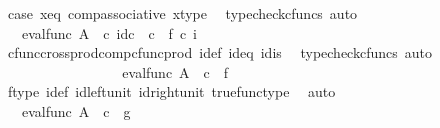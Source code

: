 \begin{isabellebody}
\ case{}\ x{\isacharunderscore}{\kern0pt}eq\ comp{\isacharunderscore}{\kern0pt}associative{}\ x{\isacharunderscore}{\kern0pt}type\ \isamarkupfalse%
\ {\isacharparenleft}{\kern0pt}typecheck{\isacharunderscore}{\kern0pt}cfuncs{\isacharcomma}{\kern0pt}\ auto{\isacharparenright}{\kern0pt}\isanewline
\ \ \ \ \ \ \ \ \ \ \ \ \isamarkupfalse%
\ \isamarkupfalse%
\ {\isachardoublequoteopen}{\isachardot}{\kern0pt}{\isachardot}{\kern0pt}{\isachardot}{\kern0pt}\ {\isacharequal}{\kern0pt}\ eval{\isacharunderscore}{\kern0pt}func\ A\ {\isasymOmega}\ {\isasymcirc}\isactrlsub c\ {\isasymlangle}id\isactrlsub c\ {\isasymOmega}\ {\isasymcirc}\isactrlsub c\ \ {\isasymt}{\isacharcomma}{\kern0pt}f\ {\isasymcirc}\isactrlsub c\ i{\isasymrangle}{\isachardoublequoteclose}\isanewline
\ \ \ \ \ \ \ \ \ \ \ \ \ \ \ \ \isamarkupfalse%
\ cfunc{\isacharunderscore}{\kern0pt}cross{\isacharunderscore}{\kern0pt}prod{\isacharunderscore}{\kern0pt}comp{\isacharunderscore}{\kern0pt}cfunc{\isacharunderscore}{\kern0pt}prod\ i{\isacharunderscore}{\kern0pt}def\ id{}{\isacharunderscore}{\kern0pt}eq\ id{}{\isacharunderscore}{\kern0pt}is\ \isamarkupfalse%
\ {\isacharparenleft}{\kern0pt}typecheck{\isacharunderscore}{\kern0pt}cfuncs{\isacharcomma}{\kern0pt}\ auto{\isacharparenright}{\kern0pt}\isanewline
\ \ \ \ \ \ \ \ \ \ \ \ \isamarkupfalse%
\ \isamarkupfalse%
\ {\isachardoublequoteopen}{\isachardot}{\kern0pt}{\isachardot}{\kern0pt}{\isachardot}{\kern0pt}\ {\isacharequal}{\kern0pt}\ eval{\isacharunderscore}{\kern0pt}func\ A\ {\isasymOmega}\ {\isasymcirc}\isactrlsub c\ {\isasymlangle}{\isasymt}{\isacharcomma}{\kern0pt}\ f\ {\isasymrangle}{\isachardoublequoteclose}\isanewline
\ \ \ \ \ \ \ \ \ \ \ \ \ \ \isamarkupfalse%
\ f{\isacharunderscore}{\kern0pt}type\ i{\isacharunderscore}{\kern0pt}def\ id{\isacharunderscore}{\kern0pt}left{\isacharunderscore}{\kern0pt}unit{}\ id{\isacharunderscore}{\kern0pt}right{\isacharunderscore}{\kern0pt}unit{}\ true{\isacharunderscore}{\kern0pt}func{\isacharunderscore}{\kern0pt}type\ \isamarkupfalse%
\ auto\isanewline
\ \ \ \ \ \ \ \ \ \ \ \ \isamarkupfalse%
\ \isamarkupfalse%
\ {\isachardoublequoteopen}{\isachardot}{\kern0pt}{\isachardot}{\kern0pt}{\isachardot}{\kern0pt}\ {\isacharequal}{\kern0pt}\ eval{\isacharunderscore}{\kern0pt}func\ A\ {\isasymOmega}\ {\isasymcirc}\isactrlsub c\ {\isasymlangle}{\isasymt}{\isacharcomma}{\kern0pt}\ g{\isasymrangle}{\isachardoublequoteclose}\isanewline

\end{isabellebody}
